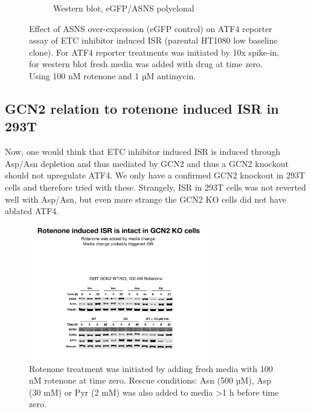 \begin{figure}[ht]
\begin{subfigure}[b]{0.6\textwidth}
         \caption{Western blot, eGFP/ASNS polyclonal}
         \label{fig:sapp:ISR:HT1080_ISR_ASNS_OE}
     \end{subfigure}
        \caption[ASNS OE, rotenone/antimycin induced ISR]{
        Effect of ASNS over-expression (eGFP control) on ATF4 reporter assay of ETC inhibitor induced ISR (parental HT1080 low baseline clone).
        For ATF4 reporter treatments was initiated by 10x spike-in, for western blot fresh media was added with drug at time zero.
        Using 100 nM rotenone and 1 µM antimycin.
        }
        \label{fig:sapp:ISR:ASNS_ISR}
\end{figure}






\FloatBarrier
\subsection{GCN2 relation to rotenone induced ISR in 293T}
Now, one would think that ETC inhibitor induced ISR is induced through Asp/Asn depletion and thus mediated by GCN2 and thus a GCN2 knockout should not upregulate ATF4.
We only have a confirmed GCN2 knockout in 293T cells and therefore tried with these.
Strangely, ISR in 293T cells was not reverted well with Asp/Asn, but even more strange the GCN2 KO cells did not have ablated ATF4.

\begin{figure}[ht]
    \centering
    \includegraphics[width=0.70\textwidth]{figures/sapp/ISR/293T_GCN2_ISR.pdf}
    \caption[ATF4 post mito inhib. GCN2 KO, western]{
    Rotenone treatment was initiated by adding fresh media with 100 nM rotenone at time zero.
    Rescue conditions: Asn (500 µM), Asp (30 mM) or Pyr (2 mM) was also added to media >1 h before time zero.
    }
    \label{fig:sapp:ISR:293T_GCN2_ISR}
\end{figure}





